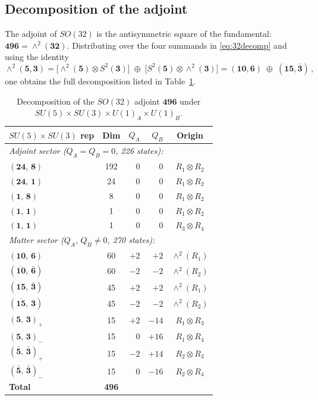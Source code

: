 \documentclass[12pt,a4paper]{article}
\begin{document}
\subsection{Decomposition of the adjoint}
The adjoint of $SO(32)$ is the antisymmetric square of the
fundamental: $\mathbf{496} = \wedge^2(\mathbf{32})$.  Distributing
over the four summands in \eqref{eq:32decomp} and using the identity
\begin{equation}
\wedge^2(\mathbf{5},\mathbf{3})
  = \bigl[\wedge^2(\mathbf{5}) \otimes S^2(\mathbf{3})\bigr]
    \;\oplus\;
    \bigl[S^2(\mathbf{5}) \otimes \wedge^2(\mathbf{3})\bigr]
  = (\mathbf{10},\mathbf{6})
    \;\oplus\;
    (\mathbf{15},\bar{\mathbf{3}})\,,
\end{equation}
one obtains the full decomposition listed in
Table~\ref{tab:496}.

\begin{table}[ht]
\centering
\caption{Decomposition of the $SO(32)$ adjoint $\mathbf{496}$
under $SU(5) \times SU(3) \times U(1)_A \times U(1)_B$.}
\label{tab:496}
\begin{tabular}{lcrrc}
\toprule
$SU(5)\!\times\!SU(3)$ rep & Dim & $Q_A$ & $Q_B$ & Origin \\
\midrule
\multicolumn{5}{l}{\textit{Adjoint sector
  ($Q_A = Q_B = 0$, 226 states):}} \\[3pt]
$(\mathbf{24},\,\mathbf{8})$ & 192 & $0$ & $0$
  & $R_1 \otimes R_2$ \\
$(\mathbf{24},\,\mathbf{1})$ & 24  & $0$ & $0$
  & $R_1 \otimes R_2$ \\
$(\mathbf{1},\,\mathbf{8})$  & 8   & $0$ & $0$
  & $R_1 \otimes R_2$ \\
$(\mathbf{1},\,\mathbf{1})$  & 1   & $0$ & $0$
  & $R_1 \otimes R_2$ \\
$(\mathbf{1},\,\mathbf{1})$  & 1   & $0$ & $0$
  & $R_3 \otimes R_4$ \\
\midrule
\multicolumn{5}{l}{\textit{Matter sector
  ($Q_A,\,Q_B \neq 0$, 270 states):}} \\[3pt]
$(\mathbf{10},\,\mathbf{6})$  & 60 & $+2$ & $+2$
  & $\wedge^2(R_1)$ \\
$(\overline{\mathbf{10}},\,\bar{\mathbf{6}})$ & 60 & $-2$ & $-2$
  & $\wedge^2(R_2)$ \\
$(\mathbf{15},\,\bar{\mathbf{3}})$ & 45 & $+2$ & $+2$
  & $\wedge^2(R_1)$ \\
$(\overline{\mathbf{15}},\,\mathbf{3})$ & 45 & $-2$ & $-2$
  & $\wedge^2(R_2)$ \\
$(\mathbf{5},\,\mathbf{3})_{+}$  & 15 & $+2$ & $-14$
  & $R_1 \otimes R_3$ \\
$(\mathbf{5},\,\mathbf{3})_{-}$  & 15 & $0$  & $+16$
  & $R_1 \otimes R_4$ \\
$(\bar{\mathbf{5}},\,\bar{\mathbf{3}})_{+}$ & 15 & $-2$ & $+14$
  & $R_2 \otimes R_3$ \\
$(\bar{\mathbf{5}},\,\bar{\mathbf{3}})_{-}$ & 15 & $0$  & $-16$
  & $R_2 \otimes R_4$ \\
\midrule
\textbf{Total} & \textbf{496} & & & \\
\bottomrule
\end{tabular}
\end{table}
\end{document}
